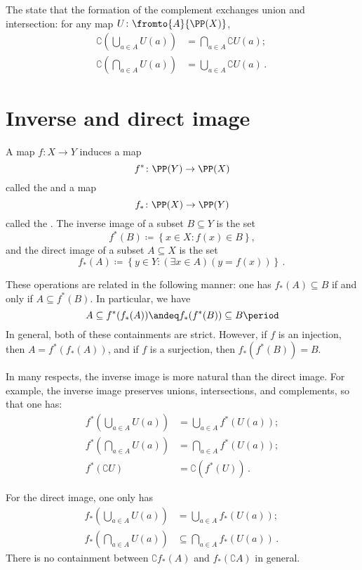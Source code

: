 The  state that the formation of the complement exchanges union and intersection:
for any map $U\colon\fromto{A}{\PP(X)}$,
\begin{align*}
	\complement\left(\bigcup_{a\in A}U(a)\right) &= \bigcap_{a\in A}\complement U(a)\semicolon \\ 
	\complement\left(\bigcap_{a\in A}U(a)\right) & =\bigcup_{a\in A}\complement U(a) \period
\end{align*}

\section{Inverse and direct image}%
\label{sec:inverse_and_direct_image}

A map $f \colon X \to Y$ induces a map
\[
	f^{\ast} \colon \PP(Y) \to \PP(X)
\]
called the  and a map
\[
	f_{\ast} \colon \PP(X) \to \PP(Y)
\]
called the .
The inverse image of a subset $B\subseteq Y$ is the set
\[
	f^{\ast}(B) \coloneq \left\{x\in X : f(x)\in B\right\} \comma
\]
and the direct image of a subset $A\subseteq X$ is the set
\[
	f_{\ast}(A) \coloneq \left\{y\in Y : (\exists x\in A)(y=f(x)) \right\} \period
\]

These operations are related in the following manner:
one has $f_{\ast}(A)\subseteq B$ if and only if $A\subseteq f^{\ast}(B)$.
In particular, we have
\[
	A \subseteq f^{\ast}(f_{\ast}(A)) \andeq f_{\ast}(f^{\ast}(B)) \subseteq B \period
\]
In general, both of these containments are strict.
However, if $f$ is an injection, then $A = f^{\ast}(f_{\ast}(A))$, and if $ f $ is a surjection, then $ f_{\ast}(f^{\ast}(B)) = B$.

In many respects, the inverse image is more natural than the direct image.
For example, the inverse image preserves unions, intersections, and complements,
so that one has:
\begin{align*}
	f^{\ast}\left(\bigcup_{a\in A}U(a)\right) &= \bigcup_{a\in A}f^{\ast}(U(a)) \semicolon \\
	f^{\ast}\left(\bigcap_{a\in A}U(a)\right) &= \bigcap_{a\in A}f^{\ast}(U(a)) \semicolon \\
	f^{\ast}(\complement U) &= \complement(f^{\ast}(U)) \period
\end{align*}

For the direct image, one only has
\begin{align*}
	f_{\ast}\left(\bigcup_{a\in A}U(a)\right) &= \bigcup_{a\in A}f_{\ast}(U(a)) \semicolon \\
	f_{\ast}\left(\bigcap_{a\in A}U(a)\right) &\subseteq \bigcap_{a\in A}f_{\ast}(U(a)) \period
\end{align*}
There is no containment between $\complement f_{\ast}(A)$ and $f_{\ast}(\complement A)$ in general.

